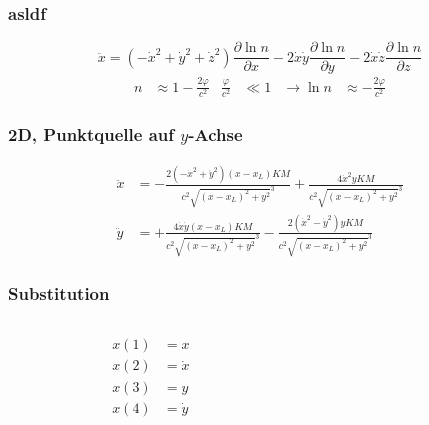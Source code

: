 \documentclass{beamer}
\newcommand{\prac}[2]{\frac{\partial#1}{\partial#2}} %
\begin{document}
\begin{frame}
  \frametitle{asldf}
  \begin{equation*}
    \ddot{x} = (-\dot{x}^2+\dot{y}^2+\dot{z}^2) \prac{\ln n}{x} -
    2\dot{x}\dot{y} \prac{\ln n}{y} - 2\dot{x}\dot{z} \prac{\ln n}{z}
  \end{equation*}
  \vspace{.5cm}
  \begin{align*}
    n &\approx 1-\frac{2\varphi}{c^2} &\frac{\varphi}{c^2} &\ll 1
    &\rightarrow \ln n &\approx -\frac{2\varphi}{c^2}
  \end{align*}
\end{frame}

\begin{frame}
  \frametitle{2D, Punktquelle auf \(y\)-Achse}
  \begin{align*}
    \ddot{x} &= -\frac{2(-\dot{x}^2+\dot{y}^2)(x-x_L)KM}
               {c^2\sqrt{(x-x_L)^2+y^2}^3}+
               \frac{4\dot{x}^2yKM}{c^2\sqrt{(x-x_L)^2+y^2}^3}\\
    \ddot{y} &= +\frac{4\dot{x}\dot{y}(x-x_L)KM}{c^2\sqrt{(x-x_L)^2+y^2}^3}
               - \frac{2(\dot{x}^2-\dot{y}^2)yKM}
               {c^2\sqrt{(x-x_L)^2+y^2}^3}
  \end{align*}
\end{frame}

\begin{frame}
  \frametitle{Substitution}
  \begin{columns}
    \begin{column}{.2\textwidth}
      \begin{align*}
        x(1) &= x\\
        x(2) &= \dot{x}\\
        x(3) &= y\\
        x(4) &= \dot{y}
      \end{align*}
    \end{column}
    \begin{column}{.8\textwidth}
    \end{column}
  \end{columns}
\end{frame}
\end{document}

